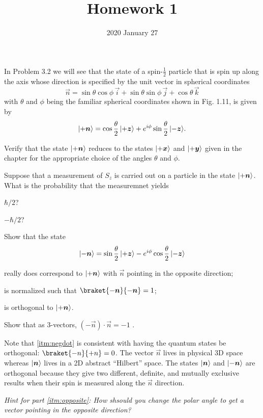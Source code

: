 \documentclass{../phys116}
\title{Homework 1}
\author{}
\date{2020 January 27}
\begin{document}
\begin{exercise}
  In Problem 3.2 we will see that the state of a spin-\(\frac 1 2\)
  particle that is spin up along the axis whose direction is specified
  by the unit vector in spherical coordinates
  \[
    \vec n
    = \sin \theta \cos \phi \, \vec i
    + \sin \theta \sin \phi \, \vec j
    + \cos \theta \, \vec k
  \]
  with \(\theta\) and \(\phi\) being the familiar spherical
  coordinates shown in Fig. 1.11, is given by
  \[
    \ket{+\vec n}
    = \cos \frac \theta 2 \, \ket{+\vec z}
    + e^{i\phi} \sin \frac \theta 2 \, \ket{-\vec z}.
  \]
  \begin{problems}
  \item Verify that the state \(\ket{+\vec n}\) reduces to the states
    \(\ket{+\vec x}\) and \(\ket{+\vec y}\) given in the chapter for
    the appropriate choice of the angles \(\theta\) and \(\phi\).
  \item Suppose that a measurement of \(S_z\) is carried out on a
    particle in the state \(\ket{+\vec n}\).  What is the probability
    that the measuremnet yields
    \begin{enumerate*}[label=(\roman*)]
    \item \(\hbar/2\)?
    \item \(-\hbar/2\)?
    \end{enumerate*}
  \end{problems}
\end{exercise}

\begin{solution}
\end{solution}

\begin{exercise}
  Show that the state
  \[
    \ket{-\vec n}
    = \sin \frac \theta 2 \, \ket{+\vec z}
    - e^{i\phi} \cos \frac \theta 2 \, \ket{-\vec z}
  \]
  \begin{problems}
  \item really does correspond to \(\ket{+\vec n}\) with \(\vec n\)
    pointing in the opposite direction; \label{itm:opposite}
  \item is normalized such that \(\braket{-\vec n}{-\vec n} = 1\);
  \item is orthogonal to \(\ket{+\vec n}\).
  \item Show that as \(3\)-vectors, \((-\vec n) \cdot \vec n = -1\)
    \label{itm:negdot}.
  \end{problems}
  Note that \ref{itm:negdot} is consistent with having the quantum
  states be orthogonal: \(\braket{-n}{+n} = 0\).  The vector
  \(\vec n\) lives in physical 3D space whereas \(\ket{\vec n}\) lives
  in a 2D abstract ``Hilbert'' space.  The states \(\ket{\vec n}\) and
  \(\ket{-\vec n}\) are orthogonal because they give two different,
  definite, and mutually exclusive results when their spin is measured
  along the \(\vec n\) direction.

  \textit{Hint for part \ref{itm:opposite}: How shsould you change the
    polar angle to get a vector pointing in the opposite direction?}
\end{exercise}

\begin{solution}
\end{solution}
\end{document}
